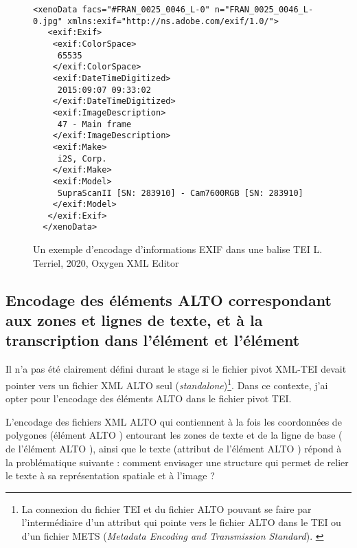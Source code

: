 \begin{figure}[h]
\lstset{language=XML}
\begin{lstlisting}
<xenoData facs="#FRAN_0025_0046_L-0" n="FRAN_0025_0046_L-0.jpg" xmlns:exif="http://ns.adobe.com/exif/1.0/">
   <exif:Exif>
    <exif:ColorSpace>
     65535
    </exif:ColorSpace>
    <exif:DateTimeDigitized>
     2015:09:07 09:33:02
    </exif:DateTimeDigitized>
    <exif:ImageDescription>
     47 - Main frame
    </exif:ImageDescription>
    <exif:Make>
     i2S, Corp.
    </exif:Make>
    <exif:Model>
     SupraScanII [SN: 283910] - Cam7600RGB [SN: 283910]
    </exif:Model>
   </exif:Exif>
  </xenoData>
\end{lstlisting} 
\caption{Un exemple d'encodage d'informations EXIF dans une balise TEI   \textcopyright L. Terriel, 2020, Oxygen XML Editor}
\label{fig:sortie_exif_xml}
\end{figure}
\newpage

\subsection{Encodage des éléments ALTO correspondant aux zones et lignes de texte, et à la transcription dans l'élément  et l'élément }

Il n'a pas été clairement défini durant le stage si le fichier pivot XML-TEI devait pointer vers un fichier XML ALTO seul (\textit{standalone})\footnote{La connexion du fichier TEI et du fichier ALTO pouvant se faire par l'intermédiaire d'un attribut qui pointe vers le fichier ALTO dans le TEI ou d'un fichier METS (\textit{Metadata Encoding and Transmission Standard}). \cite{belaid_representation_2007}}. Dans ce contexte, j'ai opter pour l'encodage des éléments ALTO dans le fichier pivot TEI.


L'encodage des fichiers XML ALTO qui contiennent à la fois les coordonnées de polygones (élément ALTO ) entourant les zones de texte et de la ligne de base ( de l'élément ALTO ), ainsi que le texte (attribut  de l'élément ALTO ) répond à la problématique suivante : comment envisager une structure qui permet de relier le texte à sa représentation spatiale et à l'image ?\\

